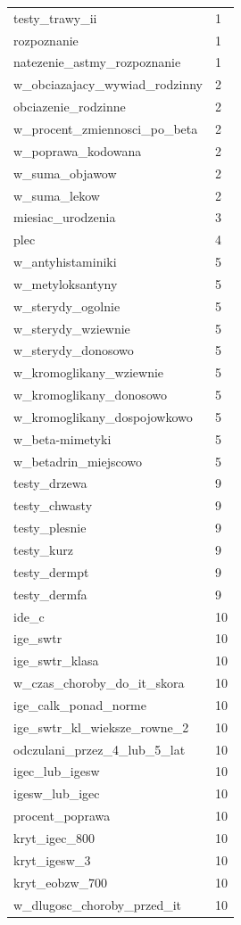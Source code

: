 \documentclass[10pt,oneside]{memoir}
\begin{document}
\begin{table}[htbp]
\begin{minipage}{\linewidth}
\begin{tabulary}{\linewidth}{@{}l@{}l@{}}
testy\_trawy\_ii&1 \\
rozpoznanie&1 \\
natezenie\_astmy\_rozpoznanie&1 \\
w\_obciazajacy\_wywiad\_rodzinny&2 \\
obciazenie\_rodzinne&2 \\
w\_procent\_zmiennosci\_po\_beta&2 \\
w\_poprawa\_kodowana&2 \\
w\_suma\_objawow&2 \\
w\_suma\_lekow&2 \\
miesiac\_urodzenia&3 \\
plec&4 \\
w\_antyhistaminiki&5 \\
w\_metyloksantyny&5 \\
w\_sterydy\_ogolnie&5 \\
w\_sterydy\_wziewnie&5 \\
w\_sterydy\_donosowo&5 \\
w\_kromoglikany\_wziewnie&5 \\
w\_kromoglikany\_donosowo&5 \\
w\_kromoglikany\_dospojowkowo&5 \\
w\_beta-mimetyki&5 \\
w\_betadrin\_miejscowo&5 \\
testy\_drzewa&9 \\
testy\_chwasty&9 \\
testy\_plesnie&9 \\
testy\_kurz&9 \\
testy\_dermpt&9 \\
testy\_dermfa&9 \\
ide\_c&10 \\
ige\_swtr&10 \\
ige\_swtr\_klasa&10 \\
w\_czas\_choroby\_do\_it\_skora&10 \\
ige\_calk\_ponad\_norme&10 \\
ige\_swtr\_kl\_wieksze\_rowne\_2&10 \\
odczulani\_przez\_4\_lub\_5\_lat&10 \\
igec\_lub\_igesw&10 \\
igesw\_lub\_igec&10 \\
procent\_poprawa&10 \\
kryt\_igec\_800&10 \\
kryt\_igesw\_3&10 \\
kryt\_eobzw\_700&10 \\
w\_dlugosc\_choroby\_przed\_it&10 \\

\end{tabulary}
\end{minipage}
\end{table}
\end{document}
